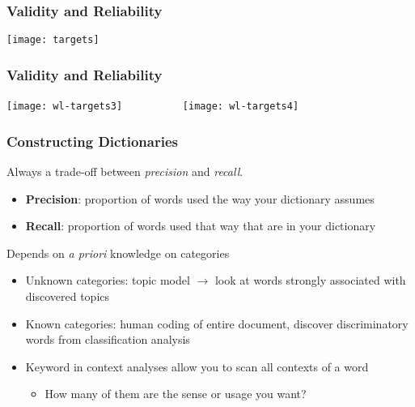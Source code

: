 \documentclass[11pt,compress,professionalfonts]{beamer}
\newcommand{\ita}{\begin{itemize}}
\newcommand{\itm}{\item[]}
\newcommand{\itz}{\end{itemize}}
\begin{document}
\begin{frame}[t]\frametitle{Validity and Reliability}

\begin{center}\texttt{[image: targets]}\end{center}

\end{frame}
\begin{frame}[t]\frametitle{Validity and Reliability}

\begin{center}\texttt{[image: wl-targets3]}
~~~~~~~~~~\texttt{[image: wl-targets4]}\end{center}




\end{frame}
\begin{frame}[t,fragile]\frametitle{Constructing Dictionaries}

Always a trade-off between {\it precision} and {\it recall}.

\ita
\itm \textbf{Precision}: proportion of words used the way your dictionary assumes
\itm \textbf{Recall}: proportion of words used that way that are in your dictionary
\itz

Depends on {\it a priori} knowledge on categories

\ita

\itm Unknown categories: topic model $\rightarrow$ look at words strongly associated with discovered topics

\itm Known categories: human coding of entire document, discover discriminatory words from classification analysis

\itm Keyword in context analyses allow you to scan all contexts of a word
\ita
\itm How many of them are the sense or usage you want?
\itz

\itz


%
%
%
%
%

%
%
%
%
%
%
%
\end{frame}
\end{document}
